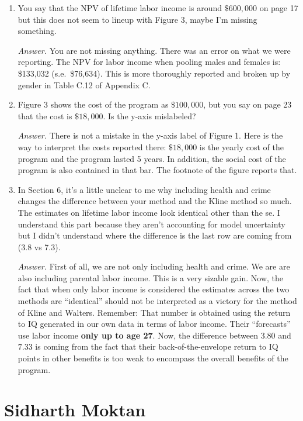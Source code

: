 \begin{enumerate}
\item You say that the NPV of lifetime labor income is around $\$600,000$ on page 17 but this does not seem to lineup with Figure 3, maybe I'm missing something.

\noindent \textit{Answer.} You are not missing anything. There was an error on what we were reporting. The NPV for labor income when pooling males and females is: \$133,032 (s.e.\ \$76,634). This is more thoroughly reported and broken up by gender in Table C.12 of Appendix C.

\item Figure 3 shows the cost of the program as $\$100,000$, but you say on page 23 that the cost is $\$18,000$. Is the y-axis mislabeled?

\noindent \textit{Answer.} There is not a mistake in the y-axis label of Figure 1. Here is the way to interpret the costs reported there: $\$18,000$ is the yearly cost of the program and the program lasted 5 years. In addition, the social cost of the program is also contained in that bar. The footnote of the figure reports that.

\item In Section 6, it's a little unclear to me why including health and crime changes the difference between your method and the Kline method so much.  The estimates on lifetime labor income look identical other than the se.  I understand this part because they aren't accounting for model uncertainty but I didn't understand where the difference is the last row are coming from (3.8 vs 7.3).

\noindent \textit{Answer.} First of all, we are not only including health and crime. We are are also including parental labor income. This is a very sizable gain. Now, the fact that when only labor income is considered the estimates across the two methods are ``identical'' should not be interpreted as a victory for the method of Kline and Walters. Remember: That number is obtained using the return to IQ generated in our own data in terms of labor income. Their ``forecasts'' use labor income \textbf{only up to age 27}. Now, the difference between $3.80$ and $7.33$ is coming from the fact that their back-of-the-envelope return to IQ points in other benefits is too weak to encompass the overall benefits of the program.
\end{enumerate}

\section{Sidharth Moktan}

